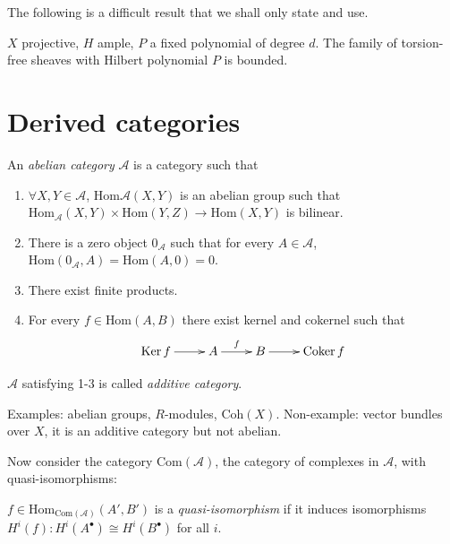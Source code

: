 The following is a difficult result that we shall only state and use.

\begin{theorem}
\label{theorem-}
$X$ projective, $H$ ample, $P$ a fixed polynomial of degree $d$. The family of
torsion-free sheaves with Hilbert polynomial $P$ is bounded.
\end{theorem}


\section{Derived categories}
\label{section-derived-categories}

\begin{definition}
\label{definition-abelian-category}
An {\it abelian category} $\mathcal{A}$ is a category such that
\begin{enumerate}
\item $\forall X,Y \in \mathcal{A}$, $\text{Hom}{\mathcal{A}}(X,Y)$ is an
abelian group such that $\text{Hom}_{\mathcal{A}}(X,Y)\times\text{Hom}(Y,Z)\to
\text{Hom}(X,Y)$ is bilinear.
\item There is a zero object $0_{\mathcal{A}}$ such that for every $A \in
\mathcal{A}$, $\text{Hom}(0_{\mathcal{A}},A)=\text{Hom}(A,0)=0$.
\item There exist finite products.
\item For every  $f \in \text{Hom}(A,B)$ there exist kernel and cokernel such
that
$$
\xymatrix{
\Ker f\ar[r]&A\ar[r]^{f}&B\ar[r]&\Coker f
}
$$
\end{enumerate}
\end{definition}

\begin{definition}
\label{definition-additive-category}
$\mathcal{A}$ satisfying 1-3 is called  {\it additive category}.
\end{definition}

Examples: abelian groups, $R$-modules, $\text{Coh}(X)$. Non-example: vector
bundles over $X$, it is an additive category but not abelian.

\medskip\noindent

Now consider the category $\text{Com}(\mathcal{A})$, the category of complexes
in $\mathcal{A}$, with quasi-isomorphisms:

\begin{definition}
\label{definition-quasi-isomorphism}
$f\in \text{Hom}_{\text{Com}(\mathcal{A})}(A',B')$ is a {\it quasi-isomorphism}
if it induces isomorphisms $H^i(f):H^i(A^{\bullet})\cong H^i(B^{\bullet})$ for
all $i$.
\end{definition}

